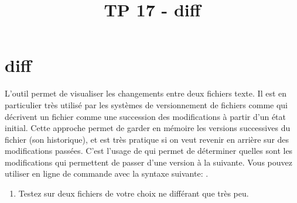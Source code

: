 \documentclass[a4paper, 10pt]{article}
\title{TP 17 - diff}
\begin{document}
\maketitle
\section{diff}
L'outil  permet de visualiser les changements entre deux fichiers texte. Il est en particulier très utilisé par les systèmes de versionnement de fichiers comme  qui décrivent un fichier comme une succession des modifications à partir d'un état initial. Cette approche permet de garder en mémoire les versions successives du fichier (son historique), et est très pratique si on veut revenir en arrière sur des modifications passées.
C'est l'usage de  qui permet de déterminer quelles sont les modifications qui permettent de passer d'une version à la suivante.
Vous pouvez utiliser  en ligne de commande avec la syntaxe suivante: .
\begin{enumerate}
\item Testez  sur deux fichiers de votre choix ne différant que très peu.
\end{enumerate}
\end{document}
